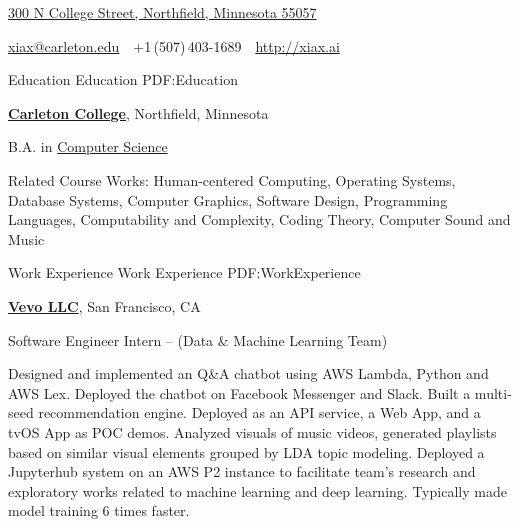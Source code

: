 \documentclass[letterpaper,MMMyyyy,nonstopmode]{simpleresumecv}
\newcommand{\CVAuthor}{Xingfan Xia}
\newcommand{\CVWebpage}{http://xiax.ai}
\begin{document}

\Title{\CVAuthor}

\begin{SubTitle}
\href{https://www.google.com/maps/place/300+N+College+Street,+Northfield,+Minnesota+55057}
{300 N College Street, Northfield, Minnesota 55057}
\par
\href{mailto:xiax@carleton.edu}
{xiax@carleton.edu}
\,\SubBulletSymbol\,
+1\,(507)\,403-1689
\,\SubBulletSymbol\,
\href{\CVWebpage}
{\url{\CVWebpage}}
\end{SubTitle}

\begin{Body}


\Section
{Education}
{Education}
{PDF:Education}

\Entry
\href{https://www.carleton.edu/}
{\textbf{Carleton College}},
Northfield, Minnesota

\Gap
\BulletItem
B.A. in
\href{https://apps.carleton.edu/curricular/cs/}
{Computer Science}
\hfill
{}
\begin{Detail}
\SubBulletItem
Related Course Works: Human-centered Computing, Operating Systems, Database Systems, Computer Graphics, Software Design, Programming Languages, Computability and Complexity, Coding Theory, Computer Sound and Music

\end{Detail}


\Section
{Work\newline
Experience}
{Work Experience}
{PDF:WorkExperience}

\Entry
\href{http://hq.vevo.com/}
{\textbf{Vevo LLC}},
San Francisco, CA

\Gap
\BulletItem
Software Engineer Intern
\hfill
{} --
\newline
(Data \& Machine Learning Team)
\begin{Detail}
\SubBulletItem
Designed and implemented an Q\&A chatbot using AWS Lambda, Python and AWS Lex. Deployed the chatbot on Facebook Messenger and Slack.
\SubBulletItem
Built a multi-seed recommendation engine. Deployed as an API service, a Web App, and a tvOS App as POC demos.
\SubBulletItem
Analyzed visuals of music videos, generated playlists based on similar visual elements grouped by LDA topic modeling.
\SubBulletItem
Deployed a Jupyterhub system on an AWS P2 instance to facilitate team's research and exploratory works related to machine learning and deep learning. Typically made model training 6 times faster.
\end{Detail}


\end{Body}
\end{document}
